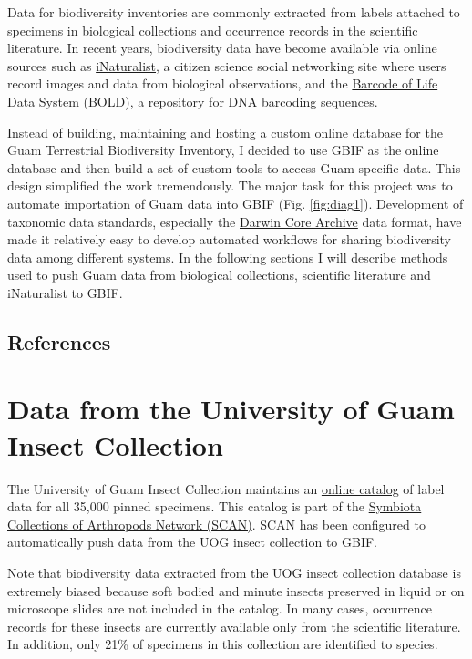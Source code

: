 \documentclass[12pt,letterpaper,english,bibliography=totocnumbered, abstract=on]{scrartcl}
\begin{document}
Data for biodiversity inventories are commonly extracted from labels attached to specimens in biological collections and occurrence records in the scientific literature. In recent years, biodiversity data have become available via online sources such as \href{https://inaturalist.org}{iNaturalist}, a citizen science social networking site where users record images and data from biological observations, and the \href{https://v3.boldsystems.org/}{Barcode of Life Data System (BOLD)}, a repository for DNA barcoding sequences.

Instead of building, maintaining and hosting a custom online database for the Guam Terrestrial Biodiversity Inventory, I decided to use GBIF as the online database and then build a set of custom tools to access Guam specific data. This design simplified the work tremendously. The major task for this project was to automate importation of Guam data into GBIF (Fig. \ref{fig:diag1}). Development of taxonomic data standards, especially the \href{https://www.gbif.org/darwin-core}{Darwin Core Archive} data format, have made it relatively easy to develop automated workflows for sharing biodiversity data among different systems. In the following sections I will describe methods used to push Guam data from biological collections, scientific literature and iNaturalist to GBIF.

\subsection{References}

\printbibliography[heading=none]





\pagebreak
\section{Data from the University of Guam Insect Collection}

The University of Guam Insect Collection maintains an \href{https://scan-bugs.org/portal/collections/misc/collprofiles.php?collid=180}{online catalog} of label data for all 35,000 pinned specimens. This catalog is part of the \href{https://scan-bugs.org/portal/}{Symbiota Collections of Arthropods Network (SCAN)}. SCAN has been configured to automatically push data from the UOG insect collection to GBIF.

Note that biodiversity data extracted from the UOG insect collection database is extremely biased because soft bodied and minute insects preserved in liquid or on microscope slides are not included in the catalog. In many cases, occurrence records for these insects are currently available only from the scientific literature. In addition, only 21\% of specimens in this collection are identified to species.
\end{document}
